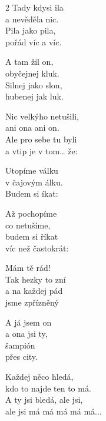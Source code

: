 \begin{multicols}{2}
\ve{}
Tady kdysi ila\\
a nevěděla nic. \\
Pila jako pila,\\
pořád víc a víc. 

A tam žil on,\\
obyčejnej kluk.\\
Silnej jako slon,\\
hubenej jak luk.

Nic velkýho netušili,\\
ani ona ani on.\\
Ale pro sebe tu byli\\
a vtip je v tom\ldots{} že:

\cho{}
Utopíme válku\\
v čajovým álku.\\
Budem si íkat:\\

Až pochopíme\\
co netušíme,\\
budem si říkat\\
víc než častokrát:

Mám tě rád!\\
Tak hezky to zní \\
a na každej pád\\
jsme zpřízněný 

\columnbreak

\ve{}
A já jsem on\\
a ona jsi ty,\\
šampión\\
přes city.

Každej něco hledá,\\
kdo to najde ten to má.\\
A ty jsi bledá, ale jsi,\\
ale jsi má má má má má...

\cho{}
\re{}
 

\vfill\vspace*{\fill}
\end{multicols}

\esong{}